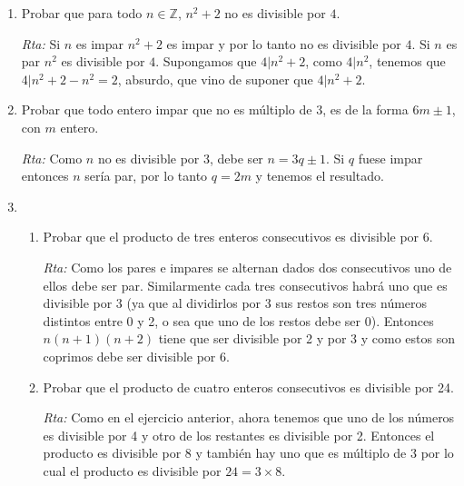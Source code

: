 \documentclass[a4paper,12pt,twoside,spanish,reqno]{amsbook}
\numberwithin{equation}{section}
\newcommand{\rta}{\noindent\textit{Rta: }}
\begin{document}
\begin{enumerate}
\begin{enumerate}
    \rta Falso, contraejemplo $n=3$.
    
    \item $3n^2+1$\, es múltiplo de 2, $\forall n \in {\mathbb N}$.
    
    \rta Falso, contraejemplo $n=2$.
    
    \item $(n+1)\cdot (5n+2)$\, es múltiplo de 2, $\forall n \in {\mathbb N}$.
    
    \rta Verdadero, si $n$ es par,  $5n+2$ es par y por lo tanto $(n + 1) \cdot (5n + 2)$ es múltiplo de $2$.    Si $n$ es impar $n+1$ es par y $2\vert (n + 1) \cdot (5n + 2)$.
\end{enumerate}



\item Probar que para todo $n \in {\mathbb Z}$, $n^2 + 2$ no es divisible por $4$.

\rta Si $n$ es impar $n^2+2$ es impar y por lo tanto no es divisible por $4$.
Si $n$ es par $n^2$ es divisible por $4$. Supongamos que $4| n^2+2$,  como $4|n^2$, tenemos que  $4| n^2+2- n^2 = 2$,  absurdo,  que vino de suponer que  $4| n^2+2$.


\item Probar que todo entero impar que no es múltiplo de 3, es de la forma $6m\pm 1$, con $m$ entero.

\rta Como $n$ no es divisible por 3, debe ser $n=3q\pm1$. Si $q$ fuese impar entonces $n$ sería par, por lo tanto $q=2m$  y tenemos el resultado.



\item 
\begin{enumerate}
    \item Probar que el producto de tres enteros consecutivos es divisible por 6.
    
    \rta Como los pares e impares se alternan dados dos consecutivos uno de ellos debe ser par. 
    Similarmente cada tres consecutivos habrá uno que es divisible por 3 (ya que al dividirlos por 3 sus restos son tres números distintos entre 0 y 2, o sea que uno de los restos debe ser 0). Entonces $n(n+1)(n+2)$ tiene que ser divisible por 2 y por 3 y como estos son coprimos debe ser divisible por 6.
    
    \item Probar que el producto de cuatro enteros consecutivos es divisible por 24.
    
    \rta Como en el ejercicio anterior, ahora tenemos que uno de los números es divisible por 4 y otro de los restantes es divisible por 2. Entonces el producto es divisible por 8 y también hay uno que es múltiplo de 3 por lo cual el producto es divisible por $24=3\times8$.
    

\end{enumerate}
\end{enumerate}
\end{document}
